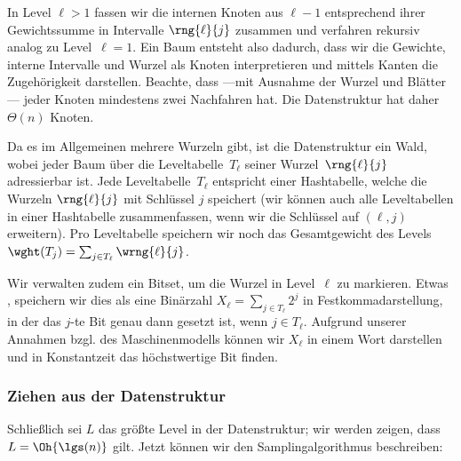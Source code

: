 In Level $\ell > 1$ fassen wir die internen Knoten aus $\ell - 1$ entsprechend ihrer Gewichtssumme in Intervalle $\rng{\ell}{j}$ zusammen und verfahren rekursiv analog zu Level~$\ell = 1$.
Ein Baum entsteht also dadurch, dass wir die Gewichte, interne Intervalle und Wurzel als Knoten interpretieren und mittels Kanten die Zugehörigkeit darstellen.
Beachte, dass ---mit Ausnahme der Wurzel und Blätter--- jeder Knoten mindestens zwei Nachfahren hat.
Die Datenstruktur hat daher $\Theta(n)$ Knoten.

Da  es im Allgemeinen mehrere Wurzeln gibt, ist die Datenstruktur ein Wald, wobei jeder Baum über die Leveltabelle~$T_\ell$ seiner Wurzel~$\rng{\ell}{j}$ adressierbar ist.
Jede Leveltabelle~$T_\ell$ entspricht einer Hashtabelle, welche die Wurzeln $\rng{\ell}{j}$ mit Schlüssel $j$ speichert (wir können auch alle Leveltabellen in einer Hashtabelle zusammenfassen, wenn wir die Schlüssel auf $(\ell, j)$ erweitern).
Pro Leveltabelle speichern wir noch das Gesamtgewicht des Levels $\wght(T_j) = \sum_{j \in T_\ell} \wrng{\ell}{j}$.

Wir verwalten zudem ein Bitset, um die Wurzel in Level~$\ell$ zu markieren.
Etwas , speichern wir dies als eine Binärzahl $X_\ell = \sum_{j \in T_\ell} 2^j$ in Festkommadarstellung, in der das $j$-te Bit genau dann gesetzt ist, wenn $j \in T_\ell$.
Aufgrund unserer Annahmen bzgl. des Maschinenmodells können wir $X_\ell$ in einem Wort darstellen und in Konstantzeit \zB das höchstwertige Bit finden.

\subsubsection{Ziehen aus der Datenstruktur}
Schließlich sei $L$ das größte Level in der Datenstruktur; wir werden zeigen, dass $L = \Oh{\lgs (n)}$ gilt.
Jetzt  können wir den Samplingalgorithmus beschreiben:

